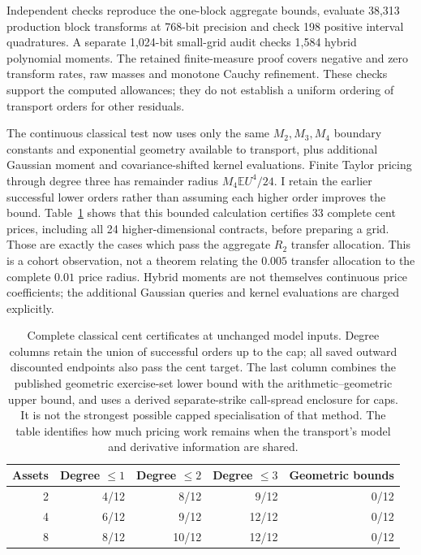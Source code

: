 \documentclass[11pt]{article}
\newcommand{\E}{\mathbb E}
\begin{document}
Independent checks reproduce the one-block aggregate bounds, evaluate
38,313 production block transforms at 768-bit precision and check 198
positive interval quadratures. A separate 1,024-bit small-grid audit checks
1,584 hybrid polynomial moments. The retained finite-measure proof covers
negative and zero transform rates, raw masses and monotone Cauchy
refinement. These checks support the computed allowances; they do not
establish a uniform ordering of transport orders for other residuals.

The continuous classical test now uses only the same $M_2,M_3,M_4$
boundary constants and exponential geometry available to transport,
plus additional Gaussian moment and covariance-shifted kernel evaluations.
Finite Taylor pricing through degree three has remainder radius
$M_4\E U^4/24$. I retain the earlier successful lower orders rather than
assuming each higher order improves the bound. Table~\ref{tab:classical-information}
shows that this bounded calculation certifies 33 complete cent prices,
including all 24 higher-dimensional contracts, before preparing a grid.
Those are exactly the cases which pass the aggregate $R_2$ transfer
allocation. This is a cohort observation, not a theorem relating the
$0.005$ transfer allocation to the complete $0.01$ price radius.
Hybrid moments are not themselves continuous price coefficients; the
additional Gaussian queries and kernel evaluations are charged explicitly.

\begin{table}[ht]
\centering\small
\begin{tabular}{rrrrr}
\toprule
Assets&Degree $\leq1$&Degree $\leq2$&Degree $\leq3$&Geometric bounds\\
\midrule
2&4/12&8/12&9/12&0/12\\
4&6/12&9/12&12/12&0/12\\
8&8/12&10/12&12/12&0/12\\
\bottomrule
\end{tabular}
\caption{Complete classical cent certificates at unchanged model inputs.
Degree columns retain the union of successful orders up to the cap;
all saved outward discounted endpoints also pass the cent target.
The last column combines the published geometric exercise-set lower bound
with the arithmetic--geometric upper bound, and uses a derived separate-strike
call-spread enclosure for caps. It is not the strongest possible capped
specialisation of that method. The table identifies how much pricing work
remains when the transport's model and derivative information are shared.}
\label{tab:classical-information}
\end{table}
\end{document}
